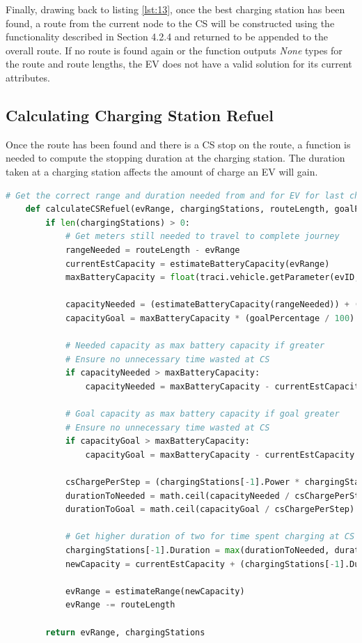 \documentclass[11pt]{report}
\begin{document}
Finally, drawing back to listing \ref{lst:13}, once the best charging station has been found, a route from the current node to the CS will be constructed using the functionality described in Section 4.2.4 and returned to be appended to the overall route. If no route is found again or the function outputs \emph{None} types for the route and route lengths, the EV does not have a valid solution for its current attributes.

\subsection{Calculating Charging Station Refuel}

Once the route has been found and there is a CS stop on the route, a function is needed to compute the stopping duration at the charging station. The duration taken at a charging station affects the amount of charge an EV will gain. 

\begin{lstlisting}[language=Python, caption=Function to compute CS refuel time, label={lst:16}]
    # Get the correct range and duration needed from and for EV for last charging station stop
    def calculateCSRefuel(evRange, chargingStations, routeLength, goalPercentage):
        if len(chargingStations) > 0:
            # Get meters still needed to travel to complete journey
            rangeNeeded = routeLength - evRange
            currentEstCapacity = estimateBatteryCapacity(evRange)
            maxBatteryCapacity = float(traci.vehicle.getParameter(evID, 'device.battery.maximumBatteryCapacity'))
    
            capacityNeeded = (estimateBatteryCapacity(rangeNeeded)) + (maxBatteryCapacity * 0.1)
            capacityGoal = maxBatteryCapacity * (goalPercentage / 100)
    
            # Needed capacity as max battery capacity if greater
            # Ensure no unnecessary time wasted at CS
            if capacityNeeded > maxBatteryCapacity:
                capacityNeeded = maxBatteryCapacity - currentEstCapacity
    
            # Goal capacity as max battery capacity if goal greater
            # Ensure no unnecessary time wasted at CS
            if capacityGoal > maxBatteryCapacity:
                capacityGoal = maxBatteryCapacity - currentEstCapacity
    
            csChargePerStep = (chargingStations[-1].Power * chargingStations[-1].Efficiency) / 3600
            durationToNeeded = math.ceil(capacityNeeded / csChargePerStep)
            durationToGoal = math.ceil(capacityGoal / csChargePerStep)
    
            # Get higher duration of two for time spent charging at CS
            chargingStations[-1].Duration = max(durationToNeeded, durationToGoal)
            newCapacity = currentEstCapacity + (chargingStations[-1].Duration * csChargePerStep)
    
            evRange = estimateRange(newCapacity)
            evRange -= routeLength
    
        return evRange, chargingStations
\end{lstlisting}
\end{document}
